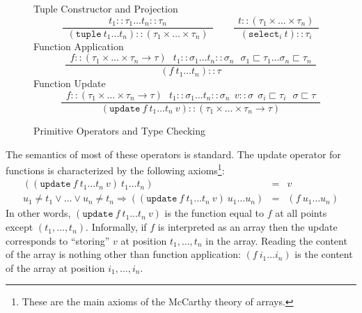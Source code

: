 \documentclass[11pt,twoside,fleqn,openright,titlepage]{cslreport}
\begin{document}
\begin{figure}
\begin{center}
\vspace*{2ex}
Tuple Constructor and Projection\\[1ex]
\begin{displaymath}
\hspace{2em}
\frac{~~t_1::\tau_1 \ldots t_n::\tau_n~~}{~~(\mathtt{tuple}\ t_1\ldots t_n)::(\tau_1\times\ldots\times\tau_n)~~}
\hspace{2em}
\frac{~~t::(\tau_1\times\ldots\times\tau_n)~~}{~~(\mathtt{select}_i\ t)::\tau_i~~}
\end{displaymath}
\vspace*{2ex}
Function Application\\[1ex]
\begin{displaymath}
\hspace{2em}
\frac{~~f::(\tau_1\times\ldots\times\tau_n\rightarrow\tau)~~~t_1::\sigma_1\ldots t_n::\sigma_n~~~\sigma_1\sqsubset\tau_1\ldots\sigma_n\sqsubset\tau_n~~}{~~~(f\ t_1\ldots t_n)::\tau~~~}
\end{displaymath}
\vspace*{2ex}
Function Update\\[1ex]
\begin{displaymath}
\hspace{2em}
\frac{~~f::(\tau_1\times\ldots\times\tau_n\rightarrow\tau)~~~t_1::\sigma_1\ldots t_n::\sigma_n~~v::\sigma~~\sigma_i\sqsubset\tau_i~~~\sigma\sqsubset\tau~~}{~~~(\mathtt{update}\ f\ t_1\ldots t_n\ v)::(\tau_1\times\ldots\times\tau_n\rightarrow\tau)~~~}
\end{displaymath}
\vspace*{2ex}
\end{center}
\caption{Primitive Operators and Type Checking}
\label{type-checking}
\end{figure}

\medskip\noindent
The semantics of most of these operators is standard. The update
operator for functions is characterized by the following
axioms\footnote{These are the main axioms of the McCarthy theory of
  arrays.}:
\begin{eqnarray*}
((\mathtt{update}\ f\ t_1\ldots t_n\ v)\ t_1\ldots t_n) & = & v \\
u_1\neq t_1\vee\ldots\vee u_n\neq t_n\Rightarrow((\mathtt{update}\ f\ t_1\ldots t_n\ v)\ u_1\ldots u_n) & = & (f\ u_1\ldots u_n)
\end{eqnarray*}
In  other  words, $(\mathtt{update}\  f\  t_1\ldots  t_n\  v)$ is  the
function  equal  to  $f$  at  all  points  except  $(t_1,\ldots,t_n)$.
Informally,  if  $f$  is  interpreted  as an  array  then  the  update
corresponds  to ``storing''  $v$ at  position $t_1,\ldots,t_n$  in the
array.   Reading  the content  of  the  array  is nothing  other  than
function application: $(f\ i_1\ldots i_n)$ is the content of the array
at position $i_1,\ldots, i_n$.
\end{document}
